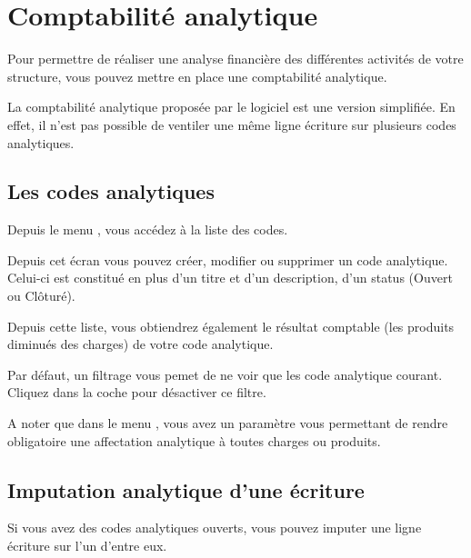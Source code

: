 \documentclass[a4paper,10pt,oneside,french]{sphinxmanual}
\begin{document}
\section{Comptabilité analytique}
\label{\detokenize{accounting/costaccounting:comptabilite-analytique}}\label{\detokenize{accounting/costaccounting::doc}}
Pour permettre de réaliser une analyse financière des différentes activités de votre structure, vous pouvez mettre en place une comptabilité analytique.

La comptabilité analytique proposée par le logiciel est une version simplifiée.
En effet, il n’est pas possible de ventiler une même ligne écriture sur plusieurs codes analytiques.


\subsection{Les codes analytiques}
\label{\detokenize{accounting/costaccounting:les-codes-analytiques}}
Depuis le menu , vous accédez à la liste des codes.

Depuis cet écran vous pouvez créer, modifier ou supprimer un code analytique. Celui-ci est constitué
en plus d’un titre et d’un description, d’un status (Ouvert ou Clôturé).

Depuis cette liste, vous obtiendrez également le résultat comptable (les produits diminués des charges) de votre code analytique.
\begin{quote}

\noindent{}
\end{quote}

Par défaut, un filtrage vous pemet de ne voir que les code analytique courant. Cliquez dans la coche pour désactiver ce filtre.

A noter que dans le menu , vous avez un paramètre vous permettant
de rendre obligatoire une affectation analytique à toutes charges ou produits.


\subsection{Imputation analytique d’une écriture}
\label{\detokenize{accounting/costaccounting:imputation-analytique-d-une-ecriture}}
Si vous avez des codes analytiques ouverts, vous pouvez imputer une ligne écriture sur l’un d’entre eux.
\begin{quote}

\noindent{}
\end{quote}
\end{document}
